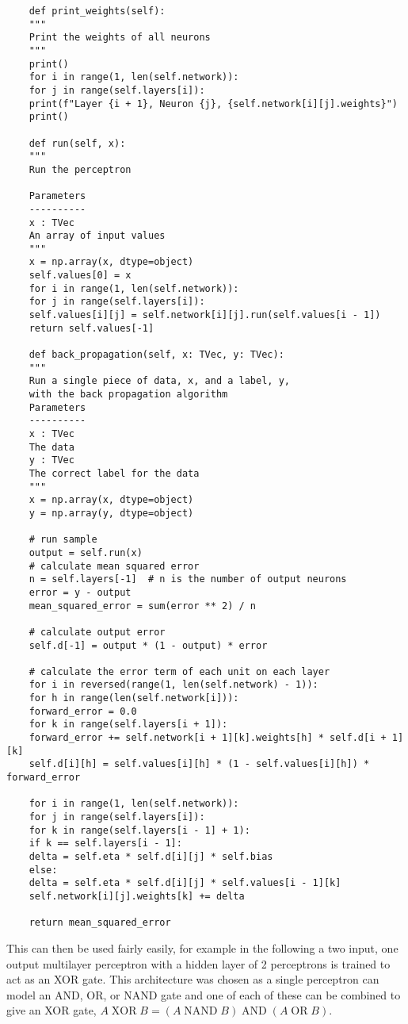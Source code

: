 \documentclass[a4paper]{article}
\begin{document}
\begin{lstlisting}
    def print_weights(self):
    """
    Print the weights of all neurons
    """
    print()
    for i in range(1, len(self.network)):
    for j in range(self.layers[i]):
    print(f"Layer {i + 1}, Neuron {j}, {self.network[i][j].weights}")
    print()
    
    def run(self, x):
    """
    Run the perceptron
    
    Parameters
    ----------
    x : TVec
    An array of input values
    """
    x = np.array(x, dtype=object)
    self.values[0] = x
    for i in range(1, len(self.network)):
    for j in range(self.layers[i]):
    self.values[i][j] = self.network[i][j].run(self.values[i - 1])
    return self.values[-1]
    
    def back_propagation(self, x: TVec, y: TVec):
    """
    Run a single piece of data, x, and a label, y,
    with the back propagation algorithm
    Parameters
    ----------
    x : TVec
    The data
    y : TVec
    The correct label for the data
    """
    x = np.array(x, dtype=object)
    y = np.array(y, dtype=object)
    
    # run sample
    output = self.run(x)
    # calculate mean squared error
    n = self.layers[-1]  # n is the number of output neurons
    error = y - output
    mean_squared_error = sum(error ** 2) / n
    
    # calculate output error
    self.d[-1] = output * (1 - output) * error
    
    # calculate the error term of each unit on each layer
    for i in reversed(range(1, len(self.network) - 1)):
    for h in range(len(self.network[i])):
    forward_error = 0.0
    for k in range(self.layers[i + 1]):
    forward_error += self.network[i + 1][k].weights[h] * self.d[i + 1][k]
    self.d[i][h] = self.values[i][h] * (1 - self.values[i][h]) * forward_error
    
    for i in range(1, len(self.network)):
    for j in range(self.layers[i]):
    for k in range(self.layers[i - 1] + 1):
    if k == self.layers[i - 1]:
    delta = self.eta * self.d[i][j] * self.bias
    else:
    delta = self.eta * self.d[i][j] * self.values[i - 1][k]
    self.network[i][j].weights[k] += delta
    
    return mean_squared_error
    \end{lstlisting}
    This can then be used fairly easily, for example in the following a two input, one output multilayer perceptron with a hidden layer of 2 perceptrons is trained to act as an XOR gate.
    This architecture was chosen as a single perceptron can model an AND, OR, or NAND gate and one of each of these can be combined to give an XOR gate, \(A\mathbin{\operatorname{XOR}}B = (A\mathbin{\operatorname{NAND}} B) \mathbin{\operatorname{AND}} (A \mathbin{\operatorname{OR}} B)\).
\end{document}
